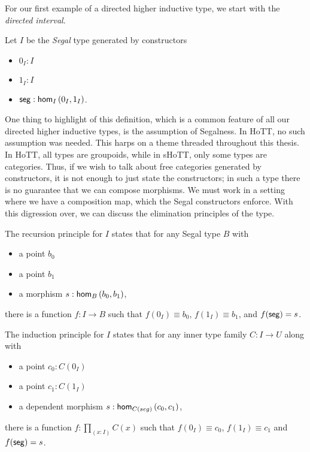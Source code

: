\documentclass[main.tex]{subfiles}
\begin{document}
\noindent 
For our first example of a directed higher inductive type, we start with the \textit{directed interval}. 

 Let $I$ be the \textit{Segal} type generated by constructors

\begin{itemize}
    \item $0_I : I$
    \item $1_I : I$
    \item $\seg : \ho[I]{0_I}{1_I}$.
\end{itemize}

One thing to highlight of this definition, which is a common feature of all our directed higher inductive types, is the assumption of Segalness. In HoTT, no such assumption was needed. This harps on a theme threaded throughout this thesis. In HoTT, all types are groupoids, while in sHoTT, only some types are categories. Thus, if we wish to talk about free categories generated by constructors, it is not enough to just state the constructors; in such a type there is no guarantee that we can compose morphisms. We must work in a setting where we have a composition map, which the Segal constructors enforce. With this digression over, we can discuss the elimination principles of the type.

\noindent The recursion principle for $I$ states that for any Segal type $B$ with

\begin{itemize}
    \item a point $b_0$
    \item a point $b_1$
    \item a morphism $s : \ho[B]{b_0}{b_1}$,
\end{itemize}
there is a function $f : I \to B$ such that $f(0_I)\equiv b_0$, $f(1_I) \equiv b_1$, and $f(\seg) = s$. 

The induction principle for $I$ states that for any inner type family $C : I \to U$ along with 
\begin{itemize}
    \item a point $c_0 : C(0_I)$
    \item a point $c_1 : C(1_I)$
    \item a dependent morphism $s : \ho[C(seg)]{c_0}{c_1}$,
\end{itemize} 
there is a function $ f : \prod_{(x : I)} C(x)$ such that $f(0_I) \equiv c_0$, $f(1_I) \equiv c_1$ and $f(\seg) = s$. %
\end{document}
